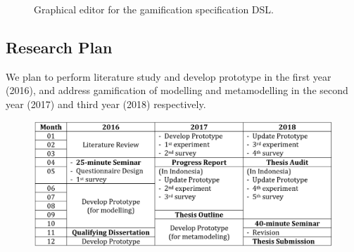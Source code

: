\documentclass[12pt, a4paper]{report}
\begin{document}
{\begin{figure}[ht]
\centering
{}
\caption{Graphical editor for the gamification specification DSL.}
\label{fig:002}
\end{figure}




\begin{appendices}

\chapter{Research Plan}
\label{Research Plan}

We plan to perform literature study and develop prototype in the first year (2016), and address gamification of modelling and metamodelling in the second year (2017) and third year (2018) respectively. 

\begin {table}[ht]
\caption {Research Timetable} 
\end{table}
\begin{figure}[ht]
\centering
\includegraphics[width=\textwidth]{timetable}
\end{figure}


\end{appendices}}
\end{document}
